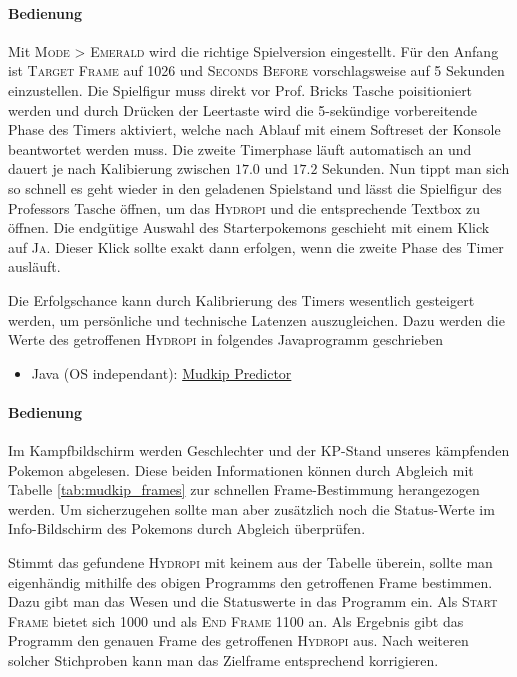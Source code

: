 \documentclass[11pt,a4paper,titlepage]{article}
\begin{document}
{{{{\paragraph{Bedienung}
Mit \textsc{Mode > Emerald} wird die richtige Spielversion eingestellt. Für den Anfang ist \textsc{Target Frame} auf 1026 und \textsc{Seconds Before} vorschlagsweise auf 5 Sekunden einzustellen. Die Spielfigur muss direkt vor Prof. Bricks Tasche poisitioniert werden und durch Drücken der Leertaste wird die 5-sekündige vorbereitende Phase des Timers aktiviert, welche nach Ablauf mit einem Softreset der Konsole beantwortet werden muss. Die zweite Timerphase läuft automatisch an und dauert je nach Kalibierung zwischen $17.0$ und $17.2$ Sekunden. Nun tippt man sich so schnell es geht wieder in den geladenen Spielstand und lässt die Spielfigur des Professors Tasche öffnen, um das \textsc{Hydropi} und die entsprechende Textbox zu öffnen. Die endgütige Auswahl des Starterpokemons geschieht mit einem Klick auf \textsc{Ja}. Dieser Klick sollte exakt dann erfolgen, wenn die zweite Phase des Timer ausläuft.

Die Erfolgschance kann durch Kalibrierung des Timers wesentlich gesteigert werden, um persönliche und technische Latenzen auszugleichen. Dazu werden die Werte des getroffenen \textsc{Hydropi} in folgendes Javaprogramm geschrieben

\begin{itemize}
\item Java (OS independant): \href{https://www.speedrun.com/tools/MudkipPredictorv4_thv6k.jar}{Mudkip Predictor}
\end{itemize}

\paragraph{Bedienung}
Im Kampfbildschirm werden Geschlechter und der KP-Stand unseres kämpfenden Pokemon abgelesen. Diese beiden Informationen können durch Abgleich mit Tabelle \ref{tab:mudkip_frames} zur schnellen Frame-Bestimmung herangezogen werden. Um sicherzugehen sollte man aber zusätzlich noch die Status-Werte im Info-Bildschirm des Pokemons durch Abgleich überprüfen.

Stimmt das gefundene \textsc{Hydropi} mit keinem aus der Tabelle überein, sollte man eigenhändig mithilfe des obigen Programms den getroffenen Frame bestimmen. Dazu gibt man das Wesen und die Statuswerte in das Programm ein. Als \textsc{Start Frame} bietet sich 1000 und als \textsc{End Frame} 1100 an. Als Ergebnis gibt das Programm den genauen Frame des getroffenen \textsc{Hydropi} aus. Nach weiteren solcher Stichproben kann man das Zielframe entsprechend korrigieren.

}}}}
\end{document}
